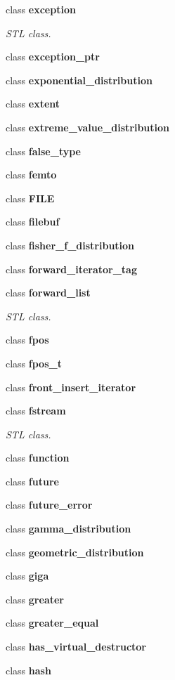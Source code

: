 \begin{DoxyCompactItemize}
class \textbf{ exception}
\begin{DoxyCompactList}\small\item\em S\+TL class. \end{DoxyCompactList}\item 
class \textbf{ exception\+\_\+ptr}
\item 
class \textbf{ exponential\+\_\+distribution}
\item 
class \textbf{ extent}
\item 
class \textbf{ extreme\+\_\+value\+\_\+distribution}
\item 
class \textbf{ false\+\_\+type}
\item 
class \textbf{ femto}
\item 
class \textbf{ F\+I\+LE}
\item 
class \textbf{ filebuf}
\item 
class \textbf{ fisher\+\_\+f\+\_\+distribution}
\item 
class \textbf{ forward\+\_\+iterator\+\_\+tag}
\item 
class \textbf{ forward\+\_\+list}
\begin{DoxyCompactList}\small\item\em S\+TL class. \end{DoxyCompactList}\item 
class \textbf{ fpos}
\item 
class \textbf{ fpos\+\_\+t}
\item 
class \textbf{ front\+\_\+insert\+\_\+iterator}
\item 
class \textbf{ fstream}
\begin{DoxyCompactList}\small\item\em S\+TL class. \end{DoxyCompactList}\item 
class \textbf{ function}
\item 
class \textbf{ future}
\item 
class \textbf{ future\+\_\+error}
\item 
class \textbf{ gamma\+\_\+distribution}
\item 
class \textbf{ geometric\+\_\+distribution}
\item 
class \textbf{ giga}
\item 
class \textbf{ greater}
\item 
class \textbf{ greater\+\_\+equal}
\item 
class \textbf{ has\+\_\+virtual\+\_\+destructor}
\item 
class \textbf{ hash}

\end{DoxyCompactItemize}
